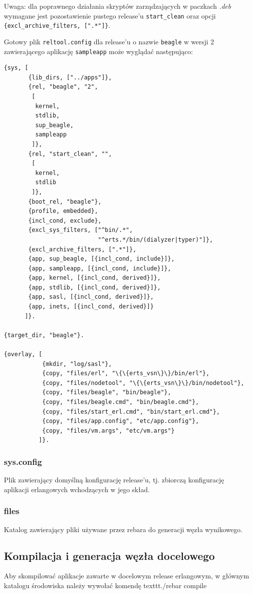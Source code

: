 \documentclass[polish,12pt]{aghthesis}
\begin{document}
Uwaga: dla poprawnego działania skryptów zarządzających w paczkach \emph{.deb} wymagane jest pozostawienie pustego release'u \texttt{start\_clean} oraz opcji \texttt{\{excl\_archive\_filters, [".*"]\}}.

Gotowy plik \texttt{reltool.config} dla release'u o nazwie \texttt{beagle} w wersji 2 zawierającego aplikację \texttt{sampleapp} może wyglądać następująco:
\begin{verbatim}
{sys, [
       {lib_dirs, ["../apps"]},
       {rel, "beagle", "2",
        [
         kernel,
         stdlib,
         sup_beagle,
         sampleapp
        ]},
       {rel, "start_clean", "",
        [
         kernel,
         stdlib
        ]},
       {boot_rel, "beagle"},
       {profile, embedded},
       {incl_cond, exclude},
       {excl_sys_filters, ["^bin/.*",
                           "^erts.*/bin/(dialyzer|typer)"]},
       {excl_archive_filters, [".*"]},
       {app, sup_beagle, [{incl_cond, include}]},
       {app, sampleapp, [{incl_cond, include}]},
       {app, kernel, [{incl_cond, derived}]},
       {app, stdlib, [{incl_cond, derived}]},
       {app, sasl, [{incl_cond, derived}]},
       {app, inets, [{incl_cond, derived}]}
      ]}.

{target_dir, "beagle"}.

{overlay, [
           {mkdir, "log/sasl"},
           {copy, "files/erl", "\{\{erts_vsn\}\}/bin/erl"},
           {copy, "files/nodetool", "\{\{erts_vsn\}\}/bin/nodetool"},
           {copy, "files/beagle", "bin/beagle"},
           {copy, "files/beagle.cmd", "bin/beagle.cmd"},
           {copy, "files/start_erl.cmd", "bin/start_erl.cmd"},
           {copy, "files/app.config", "etc/app.config"},
           {copy, "files/vm.args", "etc/vm.args"}
          ]}.
\end{verbatim}
\subsubsection{sys.config}
Plik zawierający domyślną konfigurację release'u, tj. zbiorczą konfigurację aplikacji erlangowych wchodzących w jego skład.

\subsubsection{files}
Katalog zawierający pliki używane przez rebara do generacji węzła wynikowego.

\subsection{Kompilacja i generacja węzła docelowego}
Aby skompilować aplikacje zawarte w docelowym release erlangowym, w głównym katalogu środowiska należy wywołać komendę texttt{./rebar compile}
\end{document}
